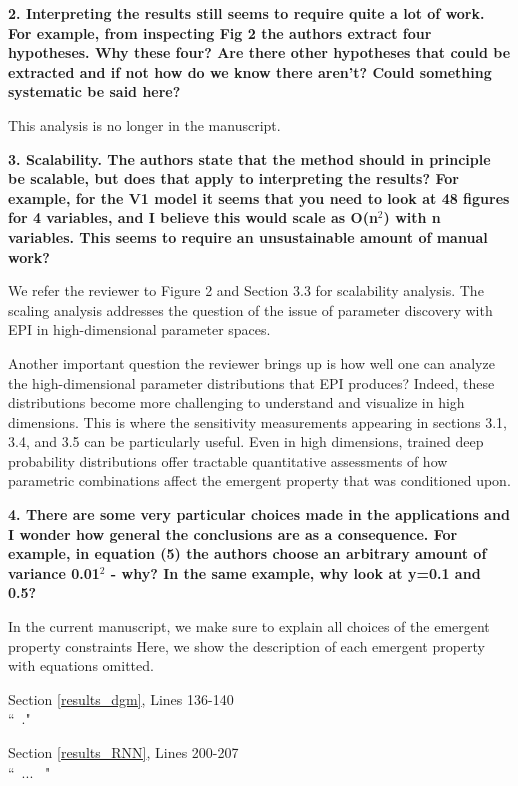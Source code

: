 \documentclass[11pt,a4paper]{article}
\begin{document}
\textbf{2. Interpreting the results still seems to require quite a lot of work. For example, from inspecting Fig 2 the authors extract four hypotheses. Why these four? Are there other hypotheses that could be extracted and if not how do we know there aren't? Could something systematic be said here? }

This analysis is no longer in the manuscript.

\textbf{3. Scalability. The authors state that the method should in principle be scalable, but does that apply to interpreting the results? For example, for the V1 model it seems that you need to look at 48 figures for 4 variables, and I believe this would scale as O(n$^2$) with n variables. This seems to require an unsustainable amount of manual work?}

We refer the reviewer to Figure 2 and Section 3.3 for scalability analysis.  The scaling analysis addresses the question of the issue of parameter discovery with EPI in high-dimensional parameter spaces.

Another important question the reviewer brings up is how well one can analyze the high-dimensional parameter distributions that EPI produces?  
Indeed, these distributions become more challenging to understand and visualize in high dimensions.  
This is where the sensitivity measurements appearing in sections 3.1, 3.4, and 3.5 can be particularly useful.  
Even in high dimensions, trained deep probability distributions offer tractable quantitative assessments of how parametric combinations affect the emergent property that was conditioned upon.

\textbf{4. There are some very particular choices made in the applications and I wonder how general the conclusions are as a consequence. For example, in equation (5) the authors choose an arbitrary amount of variance 0.01$^2$ - why? In the same example, why look at y=0.1 and 0.5? }

In the current manuscript, we make sure to explain all choices of the emergent property constraints  Here, we show the description of each emergent property with equations omitted.

\begin{displayquote}
Section \ref{results_dgm}, Lines 136-140\\
``~."
\end{displayquote}

\begin{displayquote}
Section \ref{results_RNN}, Lines 200-207\\
``~... ~"
\end{displayquote}
\end{document}
